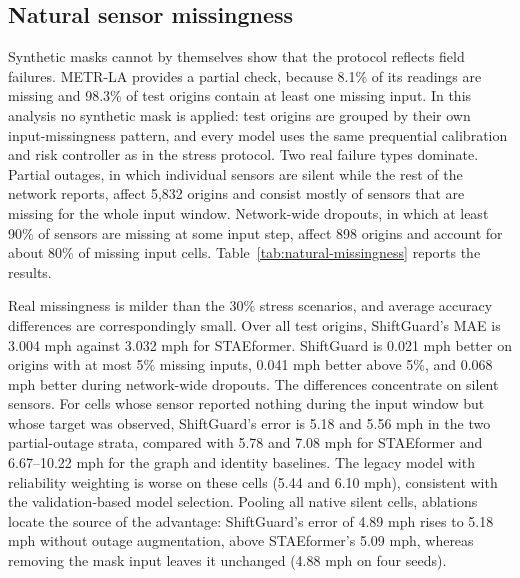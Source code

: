 \documentclass[preprint,12pt]{elsarticle}
\begin{document}
\subsection{Natural sensor missingness}
\label{sec:natural-missingness}
Synthetic masks cannot by themselves show that the protocol reflects field
failures. METR-LA provides a partial check, because 8.1\% of its readings are
missing and 98.3\% of test origins contain at least one missing input. In this
analysis no synthetic mask is applied: test origins are grouped by their own
input-missingness pattern, and every model uses the same prequential
calibration and risk controller as in the stress protocol. Two real failure
types dominate. Partial outages, in which individual sensors are silent while
the rest of the network reports, affect 5,832 origins and consist mostly of
sensors that are missing for the whole input window. Network-wide dropouts, in
which at least 90\% of sensors are missing at some input step, affect 898
origins and account for about 80\% of missing input cells.
Table~\ref{tab:natural-missingness} reports the results.

Real missingness is milder than the 30\% stress scenarios, and average
accuracy differences are correspondingly small. Over all test origins,
ShiftGuard's MAE is 3.004 mph against 3.032 mph for STAEformer. ShiftGuard is
0.021 mph better on origins with at most 5\% missing inputs, 0.041 mph better
above 5\%, and 0.068 mph better during network-wide dropouts. The differences
concentrate on silent sensors. For cells whose sensor reported nothing during
the input window but whose target was observed, ShiftGuard's error is 5.18 and
5.56 mph in the two partial-outage strata, compared with 5.78 and 7.08 mph for
STAEformer and 6.67--10.22 mph for the graph and identity baselines. The legacy
model with reliability weighting is worse on these cells (5.44 and 6.10 mph),
consistent with the validation-based model selection. Pooling all native silent
cells, ablations locate the source of the advantage: ShiftGuard's error of 4.89 mph
rises to 5.18 mph without outage augmentation, above STAEformer's 5.09 mph, whereas
removing the mask input leaves it unchanged (4.88 mph on four seeds).
\end{document}
